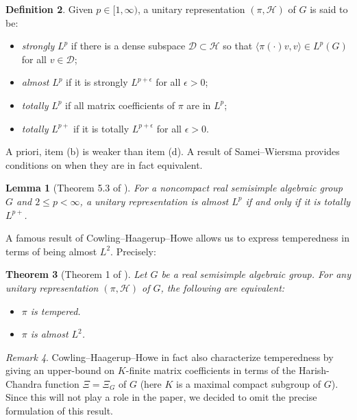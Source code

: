 \documentclass[psamsfonts]{amsart}
\newtheorem{thm}{Theorem}[section]
\newtheorem{lem}[thm]{Lemma}
\theoremstyle{definition}
\newtheorem{defn}[thm]{Definition}
\theoremstyle{remark}
\newtheorem{rem}[thm]{Remark}
\numberwithin{equation}{section}
\begin{document}
\begin{defn}
Given $p \in [1, \infty)$, a unitary representation $(\pi, \mathcal{H})$ of $G$ is said to be:
\begin{itemize}
    \item[(a)] \emph{strongly} $L^p$ if there is a dense subspace $\mathcal{D} \subset \mathcal{H}$ so that $\langle \pi(\cdot)v, v \rangle \in L^p(G)$ for all $v \in \mathcal{D}$;
    \item[(b)] \emph{almost} $L^p$ if it is strongly $L^{p+\epsilon}$ for all $\epsilon > 0$;
    \item[(c)] \emph{totally} $L^p$ if all matrix coefficients of $\pi$ are in $L^{p}$; 
    \item[(d)] \emph{totally} $L^{p+}$ if it is totally $L^{p+\epsilon}$ for all $\epsilon > 0$. 
\end{itemize} A priori, item (b) is weaker than item (d). A result of Samei--Wiersma provides conditions on when they are in fact equivalent.
\begin{lem} [Theorem 5.3 of \cite{SW}]
\label{almosttotallyequiv}
For a noncompact real semisimple algebraic group $G$ and $2 \leq p < \infty$, a unitary representation is almost $L^p$ if and only if it is totally $L^{p+}$.
\end{lem}
\end{defn}
A famous result of Cowling--Haagerup--Howe allows us to express temperedness in terms of being almost $L^2$. Precisely:
\begin{thm}[Theorem 1 of \cite{CHH}]
\label{CowlingHaagerupHowe}
Let $G$ be a real semisimple algebraic group. For any unitary representation $(\pi, \mathcal{H})$ of $G$, the following are equivalent:
\begin{itemize}
    \item[(i)] $\pi$ is tempered.
    \item[(ii)] $\pi$ is almost $L^2$.
\end{itemize}
\end{thm}
\begin{rem}
Cowling--Haagerup--Howe in fact also characterize temperedness by giving an upper-bound on $K$-finite matrix coefficients in terms of the Harish-Chandra function $\Xi = \Xi_{G}$ of $G$ (here $K$ is a maximal compact subgroup of $G$). Since this will not play a role in the paper, we decided to omit the precise formulation of this result.
\end{rem}
\end{document}
